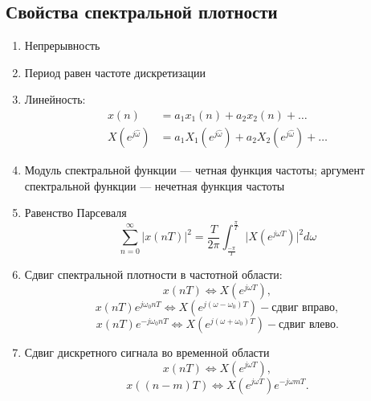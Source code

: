 \documentclass[a4paper, 14pt]{extarticle}
\begin{document}
\subsection{Свойства спектральной плотности}
\begin{enumerate}
    \item Непрерывность
    \item Период равен частоте дискретизации
    \item Линейность:
        \begin{equation}
            \begin{split}
                x(n) &= a_1 x_1(n) + a_2 x_2(n) + \ldots\\
                X(e^{j\hat{ \omega  }}) &= a_1 X_1(e^{j \hat{ \omega }}) + a_2 X_2(e^{j \hat{ \omega }}) + \ldots
            \end{split}
        \end{equation}
    \item Модуль спектральной функции --- четная функция частоты; аргумент спектральной функции --- нечетная функция частоты
    \item Равенство Парсеваля
    \begin{equation}
        \sum^{\infty}_{n=0} |x(nT)|^2 = \frac{T}{2\pi} \int^{ \frac{\pi}{T} }_{ \frac{-\pi}{T} } \big| X(e^{j \omega T}) \big|^2 d\omega
    \end{equation}
    \item Сдвиг спектральной плотности в частотной области:
        \begin{equation}
            x(nT) \Leftrightarrow X(e^{j\omega T}),
        \end{equation}
        \begin{equation}
            x(nT)e^{j\omega_0 nT} \Leftrightarrow X(e^{j(\omega - \omega_0)T}) - \text{сдвиг вправо},
        \end{equation}
        \begin{equation}
            x(nT)e^{-j\omega_0 nT} \Leftrightarrow X(e^{j(\omega + \omega_0)T}) - \text{сдвиг влево}.
        \end{equation}
    \item Сдвиг дискретного сигнала во временной области
    \begin{equation}
            x(nT) \Leftrightarrow X(e^{j\omega T}),
    \end{equation}
    \begin{equation}
        x((n-m)T) \Leftrightarrow X(e^{j \omega T}) e^{-j \omega mT}.
    \end{equation}
\end{enumerate}
\end{document}
